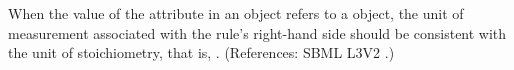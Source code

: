 When the value of the attribute  in an \AssignmentRule
object refers to a \SpeciesReference object, the unit of measurement
associated with the rule's right-hand side should be consistent with the
unit of stoichiometry, that is, .  (References: SBML
L3V2 .)
